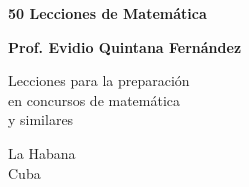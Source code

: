 \begin{titlepage}
    \begin{center}
        \vspace*{1cm}
        
        \Huge
        \textbf{50 Lecciones de Matemática}
        
        \vspace{1cm}
        \LARGE
        
    
        \textbf{Prof. Evidio Quintana Fernández}
        
        \vfill
        
        Lecciones para la preparación\\
        en concursos de matemática\\
        y similares
    
        
      
        \vfill
        
        \Large
        La Habana\\
        Cuba\\
        \vspace{1.0cm}
        
    \end{center}
    
\end{titlepage}